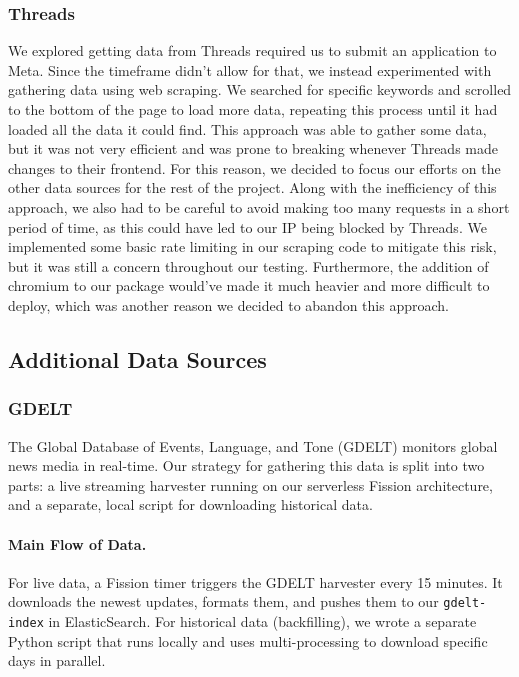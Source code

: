 \subsubsection{Threads}
We explored getting data from Threads required us to submit an application to Meta. Since the timeframe didn’t allow for that, we instead experimented with gathering data using web scraping. We searched for specific keywords and scrolled to the bottom of the page to load more data, repeating this process until it had loaded all the data it could find. This approach was able to gather some data, but it was not very efficient and was prone to breaking whenever Threads made changes to their frontend. For this reason, we decided to focus our efforts on the other data sources for the rest of the project. Along with the inefficiency of this approach, we also had to be careful to avoid making too many requests in a short period of time, as this could have led to our IP being blocked by Threads. We implemented some basic rate limiting in our scraping code to mitigate this risk, but it was still a concern throughout our testing. Furthermore, the addition of chromium to our package would’ve made it much heavier and more difficult to deploy, which was another reason we decided to abandon this approach.

\subsection{Additional Data Sources}

\subsubsection{GDELT}

The Global Database of Events, Language, and Tone (GDELT) monitors global news media in real-time. Our strategy for gathering this data is split into two parts: a live streaming harvester running on our serverless Fission architecture, and a separate, local script for downloading historical data.

\paragraph{Main Flow of Data.}
For live data, a Fission timer triggers the GDELT harvester every 15 minutes. It downloads the newest updates, formats them, and pushes them to our \texttt{gdelt-index} in ElasticSearch. For historical data (backfilling), we wrote a separate Python script that runs locally and uses multi-processing to download specific days in parallel. 

